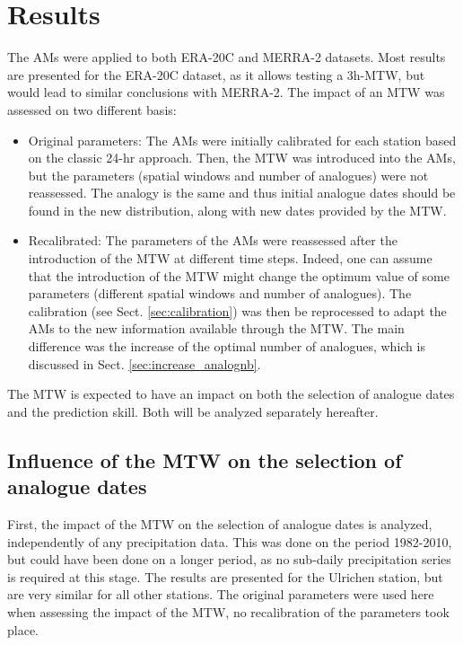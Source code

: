 \documentclass[hess, manuscript]{copernicus}
\begin{document}
	\section{Results}
	\label{sec:results}
	
	The AMs were applied to both ERA-20C and MERRA-2 datasets. Most results are presented for the ERA-20C dataset, as it allows testing a 3h-MTW, but would lead to similar conclusions with MERRA-2. The impact of an MTW was assessed on two different basis:
	\begin{itemize}
		\item Original parameters: The AMs were initially calibrated for each station based on the classic 24-hr approach. Then, the MTW was introduced into the AMs, but the parameters (spatial windows and number of analogues) were not reassessed. The analogy is the same and thus initial analogue dates should be found in the new distribution, along with new dates provided by the MTW.
		\item Recalibrated: The parameters of the AMs were reassessed after the introduction of the MTW at different time steps. Indeed, one can assume that the introduction of the MTW might change the optimum value of some parameters (different spatial windows and number of analogues). The calibration (see Sect. \ref{sec:calibration}) was then be reprocessed to adapt the AMs to the new information available through the MTW. The main difference was the increase of the optimal number of analogues, which is discussed in Sect. \ref{sec:increase_analognb}.
	\end{itemize}

	The MTW is expected to have an impact on both the selection of analogue dates and the prediction skill. Both will be analyzed separately hereafter.
	
	\subsection{Influence of the MTW on the selection of analogue dates}
	\label{sec:influence_analogue_dates}
	
	First, the impact of the MTW on the selection of analogue dates is analyzed, independently of any precipitation data. This was done on the period 1982-2010, but could have been done on a longer period, as no sub-daily precipitation series is required at this stage. The results are presented for the Ulrichen station, but are very similar for all other stations. The original parameters were used here when assessing the impact of the MTW, no recalibration of the parameters took place.
	
\end{document}
